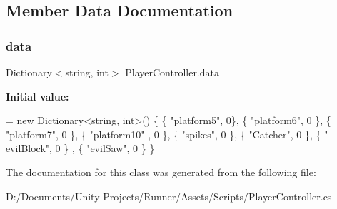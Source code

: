 \subsection{Member Data Documentation}
\mbox{\label{class_player_controller_ab3c7c08260d21126f7d7822d1f83866a}} 
\subsubsection{\texorpdfstring{data}{data}}
{\footnotesize\ttfamily Dictionary$<$string, int$>$ Player\+Controller.\+data\hspace{0.3cm}{\ttfamily [private]}}

{\bfseries Initial value\+:}
\begin{DoxyCode}
= \textcolor{keyword}{new} Dictionary<string, int>() \{ \{ \textcolor{stringliteral}{"platform5"}, 0\}, \{ \textcolor{stringliteral}{"platform6"}, 0 \}, \{ \textcolor{stringliteral}{"platform7"}, 0 \}, \{ \textcolor{stringliteral}{"platform10"}
      , 0 \},
                                                                   \{ \textcolor{stringliteral}{"spikes"}, 0 \}, \{ \textcolor{stringliteral}{"Catcher"}, 0 \}, \{ \textcolor{stringliteral}{"
      evilBlock"}, 0 \} , \{ \textcolor{stringliteral}{"evilSaw"}, 0 \} \}
\end{DoxyCode}


The documentation for this class was generated from the following file\+:\begin{DoxyCompactItemize}
\item 
D\+:/\+Documents/\+Unity Projects/\+Runner/\+Assets/\+Scripts/Player\+Controller.\+cs\end{DoxyCompactItemize}
